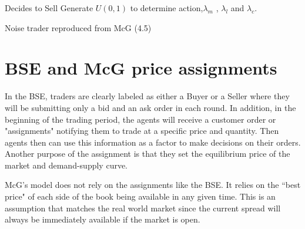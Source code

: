 \begin{algorithm}[H]
\DontPrintSemicolon 
{} {

     {
    Decides to Sell\;
    }
    \EndIf
    Generate $U(0,1)$ to determine action,$\lambda_{m}$ , $\lambda_{l}$ and $\lambda_{c}$.
    
    {
    }
  }
\EndIf
\caption{{\sc Noise trader reproduced from McG (4.5) \cite{McGroarty}} }
\end{algorithm}

\section{BSE and McG price assignments}
In the BSE, traders are clearly labeled as either a Buyer or a Seller where they will be submitting only a bid and an ask order in each round. In addition, in the beginning of the trading period, the agents will receive a customer order or "assignments" notifying them to trade at a specific price and quantity. Then agents then can use this information as a factor to make decisions on their orders. Another purpose of the assignment is that they set the equilibrium price of the market and demand-supply curve. 

McG's model does not rely on the assignments like the BSE. It relies on the ``best price" of each side of the book being available in any given time. This is an assumption that matches the real world market since the current spread will always be immediately available if the market is open. 


